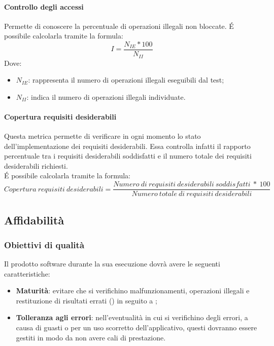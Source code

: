 \documentclass[../PianoDiQualifica.tex]{subfiles}
\begin{document}
				\paragraph{Controllo degli accessi}
				Permette di conoscere la percentuale di operazioni illegali non bloccate.
				É possibile calcolarla tramite la formula:
				\begin{equation*}
					I = \frac{N_{IE} * 100}{N_{II}}
				\end{equation*}
				Dove:
				\begin{itemize}
					\item \textbf{$N_{IE}$}: rappresenta il numero di operazioni illegali eseguibili dal test;
					\item \textbf{$N_{II}$}: indica il numero di operazioni illegali individuate.
				\end{itemize}

			\paragraph{Copertura requisiti desiderabili}
			Questa metrica permette di verificare in ogni momento lo stato dell'implementazione dei requisiti desiderabili. Essa controlla infatti il rapporto percentuale tra i requisiti desiderabili soddisfatti e il numero totale dei requisiti desiderabili richiesti.\\
			É possibile calcolarla tramite la formula:
				\begin{equation*}
					Copertura \ requisiti \ desiderabili = \frac{Numero \ di \ requisiti \ desiderabili \ soddisfatti \ * \ 100}{Numero \ totale \ di \ requisiti \ desiderabili}
				\end{equation*}
				
	
			\subsection{Affidabilità}
				\subsubsection{Obiettivi di qualità}
				Il prodotto software durante la sua esecuzione dovrà avere le seguenti caratteristiche:
				\begin{itemize}
					\item \textbf{Maturità}: evitare che si verifichino malfunzionamenti, operazioni illegali e restituzione di risultati errati () in seguito a ;
					\item \textbf{Tolleranza agli errori}: nell'eventualità in cui si verifichino degli errori, a causa di guasti o per un uso scorretto dell'applicativo, questi dovranno essere gestiti in modo da non avere cali di prestazione.
				\end{itemize}
\end{document}

